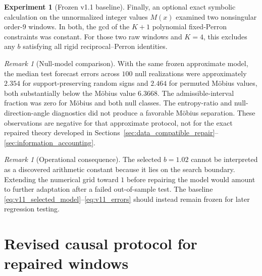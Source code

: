 \documentclass[11pt]{amsart}
\numberwithin{equation}{section}
\theoremstyle{plain}
\theoremstyle{definition}
\newtheorem{experiment}[theorem]{Experiment}
\theoremstyle{remark}
\newtheorem{remark}[theorem]{Remark}
\begin{document}
\begin{experiment}[Frozen v1.1 baseline]
Finally, an optional exact symbolic calculation on the unnormalized integer values $M(x)$ examined two nonsingular order-$9$ windows. In both, the gcd of the $K+1$ polynomial fixed-Perron constraints was constant. For those two raw windows and $K=4$, this excludes any $b$ satisfying all rigid reciprocal--Perron identities.
\end{experiment}

\begin{remark}[Null-model comparison]
\label{rem:v11_nulls}
With the same frozen approximate model, the median test forecast errors across $100$ null realizations were approximately $2.354$ for support-preserving random signs and $2.464$ for permuted M\"obius values, both substantially below the M\"obius value $6.3668$. The admissible-interval fraction was zero for M\"obius and both null classes. The entropy-ratio and null-direction-angle diagnostics did not produce a favorable M\"obius separation. These observations are negative for that approximate protocol, not for the exact repaired theory developed in Sections~\ref{sec:data_compatible_repair}--\ref{sec:information_accounting}.
\end{remark}

\begin{remark}[Operational consequence]
\label{rem:v11_consequence}
The selected $b=1.02$ cannot be interpreted as a discovered arithmetic constant because it lies on the search boundary. Extending the numerical grid toward $1$ before repairing the model would amount to further adaptation after a failed out-of-sample test. The baseline \eqref{eq:v11_selected_model}--\eqref{eq:v11_errors} should instead remain frozen for later regression testing.
\end{remark}

\section{Revised causal protocol for repaired windows}
\label{sec:repaired_protocol}
\end{document}
